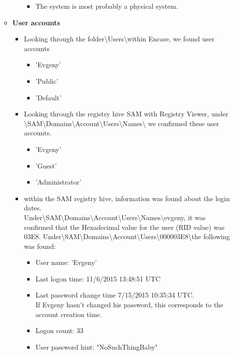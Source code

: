\begin{enumerate}
\begin{itemize}
\begin{itemize}
\begin{itemize}
			\item The system is most probably a physical system.
			
		\end{itemize}
	\end{itemize}
	
	\newpage
	\item \textbf{User accounts}
	\begin{itemize}
		\item Looking through the folder\textbackslash Users\textbackslash within Encase, we found user accounts 
		
		\begin{itemize}
			\item 'Evgeny'
			\item 'Public'
			\item 'Default'
		\end{itemize} 
		
		\item Looking through the registry hive SAM with Registry Viewer, under
		\textbackslash SAM\textbackslash Domains\textbackslash Account\textbackslash Users\textbackslash Names\textbackslash
		we confirmed these user accounts.
		
		\begin{itemize}
			\item 'Evgeny'
			\item 'Guest'
			\item 'Administrator'
		\end{itemize}
		
		\item within the SAM registry hive, information was found about the login dates.\\ 
		Under\textbackslash SAM\textbackslash Domains\textbackslash Account\textbackslash Users\textbackslash Names\textbackslash evgeny, it was confirmed that the Hexadecimal value for the user (RID value) was 03E8. 
		Under\textbackslash SAM\textbackslash Domains\textbackslash Account\textbackslash Users\textbackslash 000003E8\textbackslash the following was found:
		
		\begin{itemize}
			\item User name: 'Evgeny'
			\item Last logon time: 11/6/2015 13:48:51 UTC
			\item Last password change time 7/15/2015 10:35:34 UTC.\\
			If Evgeny hasn't changed his password, this corresponds to the account creation time.
			\item Logon count: 33
			\item User password hint: "NoSuchThingBaby"
		\end{itemize}
\end{itemize}
	

\end{itemize}
\end{enumerate}
